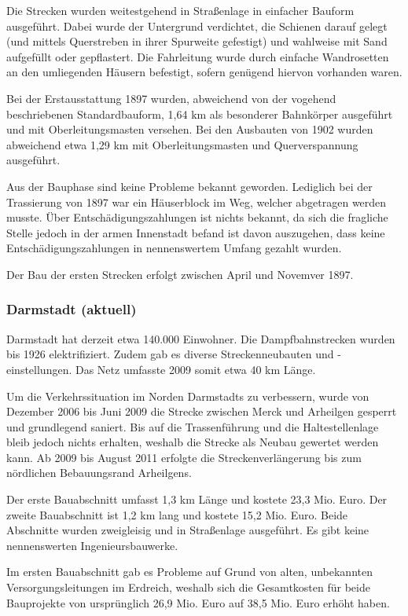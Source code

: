 Die Strecken wurden weitestgehend in Straßenlage in einfacher Bauform ausgeführt. Dabei
wurde der Untergrund verdichtet, die Schienen darauf gelegt (und mittels Querstreben in
ihrer Spurweite gefestigt) und wahlweise mit Sand aufgefüllt oder gepflastert. Die
Fahrleitung wurde durch einfache Wandrosetten an den umliegenden Häusern befestigt,
sofern genügend hiervon vorhanden waren.

Bei der Erstausstattung 1897 wurden, abweichend von der vogehend beschriebenen
Standardbauform, 1,64 km als besonderer Bahnkörper ausgeführt und mit Oberleitungsmasten
versehen.
Bei den Ausbauten von 1902 wurden abweichend etwa 1,29 km mit Oberleitungsmasten und
Querverspannung ausgeführt.

Aus der Bauphase sind keine Probleme bekannt geworden. Lediglich bei der Trassierung von
1897 war ein Häuserblock im Weg, welcher abgetragen werden musste. Über
Entschädigungszahlungen ist nichts bekannt, da sich die fragliche Stelle jedoch in der
armen Innenstadt befand ist davon auszugehen, dass keine Entschädigungszahlungen in
nennenswertem Umfang gezahlt wurden.

Der Bau der ersten Strecken erfolgt zwischen April und Novemver 1897.

\subsubsection*{Darmstadt (aktuell)}

Darmstadt hat derzeit etwa 140.000 Einwohner. Die Dampfbahnstrecken wurden bis 1926
elektrifiziert. Zudem gab es diverse Streckenneubauten und -einstellungen. Das Netz
umfasste 2009 somit etwa 40 km Länge.

Um die Verkehrssituation im Norden Darmstadts zu verbessern, wurde von Dezember 2006
bis Juni 2009 die Strecke zwischen Merck und Arheilgen gesperrt und grundlegend saniert.
Bis auf die Trassenführung und die Haltestellenlage bleib jedoch nichts erhalten, weshalb
die Strecke als Neubau gewertet werden kann. Ab 2009 bis August 2011 erfolgte die
Streckenverlängerung bis zum nördlichen Bebauungsrand Arheilgens.

Der erste Bauabschnitt umfasst 1,3 km Länge und kostete 23,3 Mio. Euro. Der zweite
Bauabschnitt ist 1,2 km lang und kostete 15,2 Mio. Euro. Beide Abschnitte wurden
zweigleisig und in Straßenlage ausgeführt. Es gibt keine nennenswerten Ingenieursbauwerke.

Im ersten Bauabschnitt gab es Probleme auf Grund von alten, unbekannten
Versorgungsleitungen im Erdreich, weshalb sich die Gesamtkosten für beide Bauprojekte von
ursprünglich 26,9 Mio. Euro auf 38,5 Mio. Euro erhöht haben.


